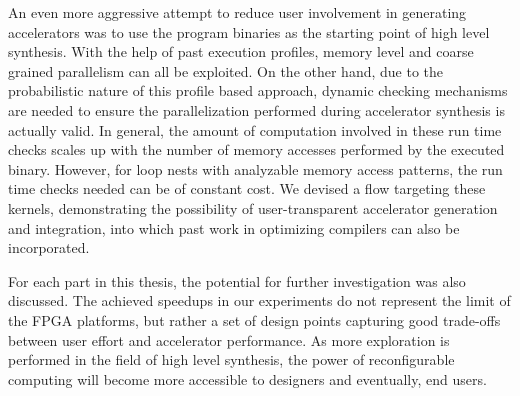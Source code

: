 An even more aggressive attempt to reduce user involvement in generating accelerators was to use the program binaries as the
starting point of high level synthesis. With the help of past execution profiles, memory level and coarse grained parallelism
can all be exploited. 
On the other hand, due to the probabilistic nature of this profile based approach, dynamic checking mechanisms are needed to ensure the parallelization performed during accelerator synthesis is actually valid. In general, the amount of computation involved in these run time checks scales up with the number of memory accesses performed by the executed binary. However, for loop nests
with analyzable memory access patterns, the run time checks needed
can be of constant cost. We devised a flow targeting these kernels, demonstrating the possibility of user-transparent accelerator generation and integration, into which past work
in optimizing compilers can also be incorporated.

For each part in this thesis, the potential for further investigation was also discussed. The achieved speedups in our experiments do not represent the limit of the FPGA platforms, but rather a set of design points capturing good trade-offs between
user effort and accelerator performance. As more exploration 
is performed in the field of high level synthesis, the power
of reconfigurable computing will become more accessible to designers and eventually, end users.